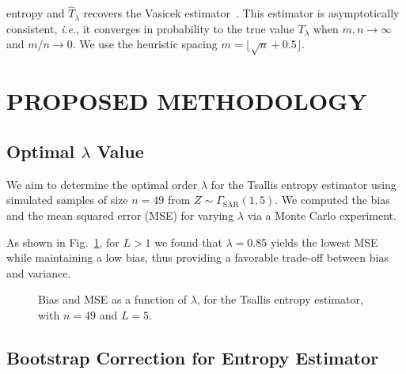 \documentclass[
  lettersize  journal,
]{IEEEtran}%
\begin{document}
entropy and \(\widehat T_{\lambda}\) recovers the Vasicek
estimator~. This estimator is
asymptotically consistent, \emph{i.e.}, it converges in probability to
the true value \(T_\lambda\) when \(m,n\rightarrow\infty\) and
\(m/n\rightarrow0\). We use the heuristic spacing
\(m=\lfloor\sqrt{n}+0.5\rfloor\).

\section{PROPOSED METHODOLOGY}\label{sec:met}

\subsection{\texorpdfstring{Optimal \(\lambda\)
Value}{Optimal \textbackslash lambda Value}}\label{optimal-lambda-value}

We aim to determine the optimal order \(\lambda\) for the Tsallis
entropy estimator using simulated samples of size \(n = 49\) from
\(Z\sim \Gamma_{\text{SAR}}(1,5)\). We computed the bias and the mean
squared error (MSE) for varying \(\lambda\) via a Monte Carlo
experiment.

As shown in Fig.~\ref{fig-optimal_order-tsallis}, for \(L>1\) we found
that \(\lambda=0.85\) yields the lowest MSE while maintaining a low
bias, thus providing a favorable trade-off between bias and variance.

\begin{figure}[H]


\caption{\label{fig-optimal_order-tsallis}Bias and MSE as a function of
\(\lambda\), for the Tsallis entropy estimator, with \(n = 49\) and
\(L = 5\).}

\end{figure}%

\subsection{Bootstrap Correction for Entropy
Estimator}\label{bootstrap-correction-for-entropy-estimator}
\end{document}

